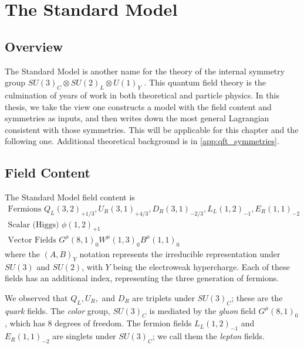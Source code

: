 \chapter{The Standard Model}

\section{Overview}


The Standard Model is another name for the theory of the internal symmetry group $SU(3)_C \otimes SU(2)_L \otimes U(1)_Y$ .
This quantum field theory is the culmination of years of work in both theoretical and particle physics.  
In this thesis, we take the view one constructs a model with the field content and symmetries as inputs, and then writes down the most general Lagrangian consistent with those symmetries.
This will be applicable for this chapter and the following one.
Additional theoretical background is in \ref{app:qft_symmetries}.

\section{Field Content}

The Standard Model field content is
\begin{equation}
\begin{aligned}
\text{Fermions } Q_L(3,2)_{+1/3}, \xspace  U_R(3,1)_{+4/3},\xspace  D_R(3,1)_{-2/3} ,\xspace  L_L(1,2)_{-1} ,\xspace  E_R(1,1)_{-2}\\
\text{Scalar (Higgs) } \xspace \phi(1,2)_{+1} \\
\text{Vector Fields } \xspace G^\mu(8,1)_0 \xspace W^\mu(1,3)_0  \xspace B^\mu(1,1)_0
\end{aligned}
\end{equation}
where the $(A, B)_Y$ notation represents the irreducible representation under $SU(3)$ and $SU(2)$, with $Y$ being the electroweak hypercharge.
Each of these fields has an additional index, representing the three generation of fermions.

We observed that $Q_L, U_R,$ and $D_R$ are triplets under $SU(3)_C$; these are the \textit{quark} fields.
The \textit{color} group, $SU(3)_C$ is mediated by the \textit{gluon} field $G^\mu(8,1)_0$, which has 8 degrees of freedom.
The fermion fields $L_L(1,2)_{-1}$ and $  E_R(1,1)_{-2} $ are singlets under $SU(3)_C$; we call them the \textit{lepton} fields.

